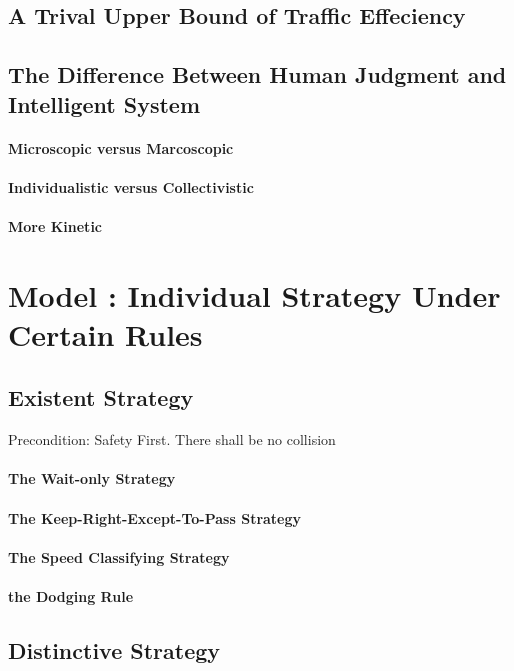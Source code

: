 \subsection{A Trival Upper Bound of Traffic Effeciency}

\subsection{The Difference Between Human Judgment and Intelligent System}
\paragraph{Microscopic versus Marcoscopic}
\paragraph{Individualistic versus Collectivistic}
\paragraph{More Kinetic}

\section{Model \uppercase\expandafter{}: Individual Strategy Under Certain Rules}
\subsection{Existent Strategy}
Precondition: Safety First. There shall be no collision
\paragraph{The Wait-only Strategy}
\paragraph{The Keep-Right-Except-To-Pass Strategy}
\paragraph{The Speed Classifying Strategy}
\paragraph{the Dodging Rule}
\subsection{Distinctive Strategy}


